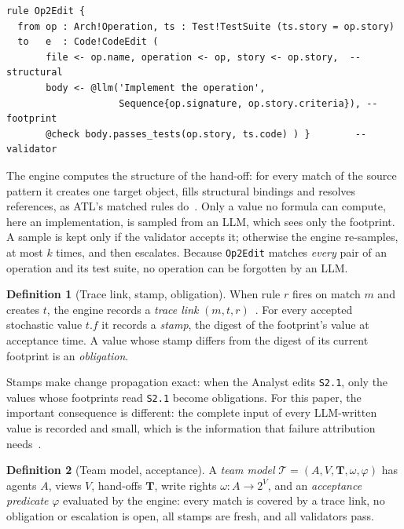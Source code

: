 \documentclass[10pt,conference]{IEEEtran}
\theoremstyle{definition}
\newtheorem{definition}{Definition}
\newcommand{\devteam}{\textsc{DevTeam}}
\newcommand{\team}{\mathcal{T}}
\newcommand{\code}[1]{\texttt{#1}}
\begin{document}
\begin{lstlisting}[language=ATL, caption={Hand-off \code{Arch2Code} of \devteam{}. \code{@llm} marks a value an LLM writes; \code{@check} its validator.}, label={lst:rule}]
rule Op2Edit {
  from op : Arch!Operation, ts : Test!TestSuite (ts.story = op.story)
  to   e  : Code!CodeEdit (
       file <- op.name, operation <- op, story <- op.story,  -- structural
       body <- @llm('Implement the operation',
                    Sequence{op.signature, op.story.criteria}), -- footprint
       @check body.passes_tests(op.story, ts.code) ) }        -- validator
\end{lstlisting}

The engine computes the structure of the hand-off: for every match of the
source pattern it creates one target object, fills structural bindings and
resolves references, as ATL's matched rules do~\cite{jouault2008atl}. Only a
value no formula can compute, here an implementation, is sampled from an
LLM, which sees only the footprint. A sample is kept only if the validator
accepts it; otherwise the engine re-samples, at most $k$ times, and then
escalates. Because \code{Op2Edit} matches \emph{every} pair of an operation
and its test suite, no operation can be forgotten by an LLM.

\begin{definition}[Trace link, stamp, obligation]\label{def:trace}
When rule $r$ fires on match $m$ and creates $t$, the engine records a
\emph{trace link} $(m,t,r)$~\cite{jouault2005traceability,vara2014metagem}.
For every accepted stochastic value $t.f$ it records a \emph{stamp}, the digest
of the footprint's value at acceptance time. A value whose stamp differs
from the digest of its current footprint is an \emph{obligation}.
\end{definition}

Stamps make change propagation exact: when the Analyst edits \code{S2.1},
only the values whose footprints read \code{S2.1} become obligations. For
this paper, the important consequence is different: the complete input of
every LLM-written value is recorded and small, which is the information that
failure attribution needs~\cite{chen2026traceelephant}.

\begin{definition}[Team model, acceptance]\label{def:team}
A \emph{team model} $\team=(A,V,\mathbf{T},\omega,\varphi)$ has agents $A$,
views $V$, hand-offs $\mathbf{T}$, write rights $\omega:A\to 2^V$, and an
\emph{acceptance predicate} $\varphi$ evaluated by the engine: every match is
covered by a trace link, no obligation or escalation is open, all stamps are
fresh, and all validators pass.
\end{definition}
\end{document}
